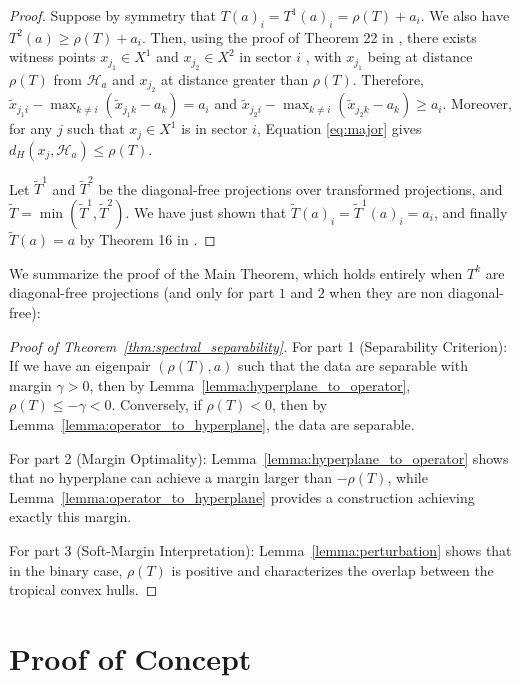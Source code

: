 \documentclass{article}
\renewcommand{\leq}{\leqslant}
\begin{document}
\begin{proof}
Suppose by symmetry that $T(a)_{i}=T^{1}(a)_{i}=\rho(T)+a_{i}$. We
also have $T^{2}(a)\ge\rho(T)+a_{i}$. Then, using the proof of Theorem
22 in \cite{akiangaubertqisaadi}, there exists witness points $x_{j_{1}}\in X^{1}$ and
$x_{j_{2}}\in X^{2}$ in sector $i$ , with $x_{j_{1}}$ being at
distance $\rho(T)$ from $\mathcal{H}_{a}$ and $x_{j_{2}}$ at distance
greater than $\rho(T)$. Therefore, $\tilde{x}_{j_{1}i}-\max_{k\ne i}(\tilde{x}_{j_{1}k}-a_{k})=a_{i}$
and $\tilde{x}_{j_{2}i}-\max_{k\ne i}(\tilde{x}_{j_{2}k}-a_{k})\ge a_{i}$.
Moreover, for any $j$ such that $x_{j}\in X^1$ is in sector $i$,
Equation \ref{eq:major} gives $d_{H}(x_{j},\mathcal{H}_{a})\le\rho(T)$.

Let $\tilde{T}^{1}$ and $\tilde{T}^{2}$ be the diagonal-free projections
over transformed projections, and $\tilde{T}=\min(\tilde{T}^{1},\tilde{T}^{2})$.
We have just shown that $\tilde{T}(a)_{i}=\tilde{T}^{1}(a)_{i}=a_{i}$,
and finally $\tilde{T}(a)=a$ by Theorem 16 in \cite{allamigeon_condition}.
\end{proof}

We summarize the proof of the Main Theorem, which holds entirely when $T^k$ are diagonal-free projections (and only for part $1$ and $2$ when they are non diagonal-free):

\begin{proof}[Proof of Theorem~\ref{thm:spectral_separability}]
For part 1 (Separability Criterion): If we have an eigenpair $(\rho(T),a)$ such that the data are separable with margin $\gamma > 0$, then by Lemma~\ref{lemma:hyperplane_to_operator}, $\rho(T) \leq -\gamma < 0$. Conversely, if $\rho(T) < 0$, then by Lemma~\ref{lemma:operator_to_hyperplane}, the data are separable.

For part 2 (Margin Optimality): Lemma~\ref{lemma:hyperplane_to_operator} shows that no hyperplane can achieve a margin larger than $-\rho(T)$, while Lemma~\ref{lemma:operator_to_hyperplane} provides a construction achieving exactly this margin.

For part 3 (Soft-Margin Interpretation): Lemma~\ref{lemma:perturbation} shows that in the binary case, $\rho(T)$ is positive and characterizes the overlap between the tropical convex hulls.
\end{proof}

\section{Proof of Concept}\label{appendix:empirical}
\end{document}
